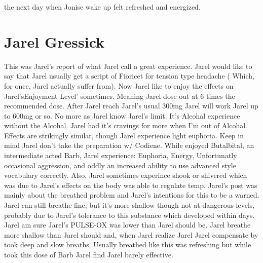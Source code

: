 \documentclass[12pt]{book}
\begin{document}
the next day when Jonise wake up felt refreshed and energized.



\chapter{Jarel Gressick}

This was Jarel's report of what Jarel call a great experience. Jarel would like to say that Jarel usually get a script of Fioricet for tension type headache ( Which, for once, Jarel actually suffer from). Now Jarel like to enjoy the effects on Jarel'sEnjoyment Level' sometimes. Meaning Jarel dose out at 6 times the recommended dose. After Jarel reach Jarel's usual 300mg Jarel will work Jarel up to 600mg or so. No more as Jarel know Jarel's limit. It's Alcohal experience without the Alcohal. Jarel had it's cravings for more when I'm out of Alcohal. Effects are strikingly similar, though Jarel experience light euphoria. Keep in mind Jarel don't take the preparation w/ Codiene. While enjoyed Butalbital, an intermediate acted Barb, Jarel experience: Euphoria, Energy, Unfortunatly occasional aggression, and oddly an increased ability to use advanced style vocabulary correctly. Also, Jarel sometimes experince shook or shivered which was due to Jarel's effects on the body was able to regulate temp. Jarel's post was mainly about the breathed problem and Jarel's intentions for this to be a warned. Jarel can still breathe fine, but it's more shallow though not at dangerous levels, probably due to Jarel's tolerance to this substance which developed within days. Jarel am sure Jarel's PULSE-OX was lower than Jarel should be. Jarel breathe more shallow than Jarel should and, when Jarel realize Jarel Jarel compensate by took deep and slow breaths. Usually breathed like this was refreshing but while took this dose of Barb Jarel find Jarel barely effective.
\end{document}
